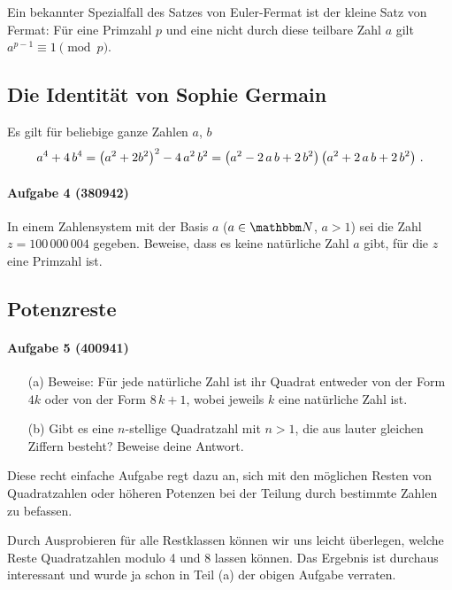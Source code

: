 \documentclass[11pt,a4paper]{article}
\begin{document}
Ein bekannter Spezialfall des Satzes von Euler-Fermat ist der kleine Satz von
Fermat: Für eine Primzahl $p$ und eine nicht durch diese teilbare Zahl $a$
gilt $a^{p-1}\equiv 1\pmod{p}$.

\subsection*{Die Identität von Sophie Germain}

Es gilt für beliebige ganze Zahlen $a$, $b$
\begin{gather*}
  a^{4}+4\,b^{4} =\left(a^{2}+2b^{2}\right)^{2}-4\,a^{2}\,b^{2}
  =\left(a^{2}-2\,a\,b+2\,b^{2}\right)\left(a^{2}+2\,a\,b+2\,b^{2}\right)\,.
\end{gather*}

\paragraph{Aufgabe 4 (380942)} 
In einem Zahlensystem mit der Basis $a$ ($a\in\N$, $a>1$) sei die Zahl
$z=100\,000\,004$ gegeben. Beweise, dass es keine natürliche Zahl $a$ gibt,
für die $z$ eine Primzahl ist.

\subsection*{Potenzreste}

\paragraph{Aufgabe 5 (400941)} 
\begin{itemize}
\item [(a)] Beweise: Für jede natürliche Zahl ist ihr Quadrat entweder von der
  Form $4k$ oder von der Form $8\,k+1$, wobei jeweils $k$ eine natürliche Zahl
  ist.
\item [(b)] Gibt es eine $n$-stellige Quadratzahl mit $n>1$, die aus lauter
  gleichen Ziffern besteht? Beweise deine Antwort.
\end{itemize}

Diese recht einfache Aufgabe regt dazu an, sich mit den möglichen Resten von
Quadratzahlen oder höheren Potenzen bei der Teilung durch bestimmte Zahlen zu
befassen.

Durch Ausprobieren für alle Restklassen können wir uns leicht überlegen,
welche Reste Quadratzahlen modulo 4 und 8 lassen können. Das Ergebnis ist
durchaus interessant und wurde ja schon in Teil (a) der obigen Aufgabe
verraten.
\end{document}
